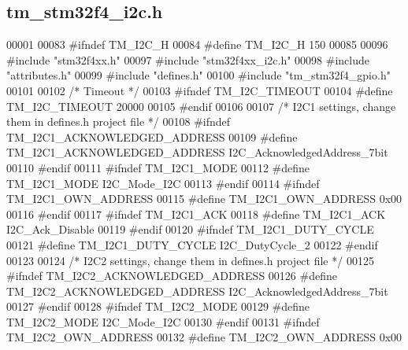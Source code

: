 \hypertarget{tm__stm32f4__i2c_8h_source}{}\subsection{tm\+\_\+stm32f4\+\_\+i2c.\+h}

\begin{DoxyCode}
00001 
00083 \textcolor{preprocessor}{#ifndef TM\_I2C\_H}
00084 \textcolor{preprocessor}{#define TM\_I2C\_H 150}
00085 
00096 \textcolor{preprocessor}{#include "stm32f4xx.h"}
00097 \textcolor{preprocessor}{#include "stm32f4xx\_i2c.h"}
00098 \textcolor{preprocessor}{#include "attributes.h"}
00099 \textcolor{preprocessor}{#include "defines.h"}
00100 \textcolor{preprocessor}{#include "tm\_stm32f4\_gpio.h"}
00101 
00102 \textcolor{comment}{/* Timeout */}
00103 \textcolor{preprocessor}{#ifndef TM\_I2C\_TIMEOUT}
00104 \textcolor{preprocessor}{#define TM\_I2C\_TIMEOUT                  20000}
00105 \textcolor{preprocessor}{#endif}
00106 
00107 \textcolor{comment}{/* I2C1 settings, change them in defines.h project file */}
00108 \textcolor{preprocessor}{#ifndef TM\_I2C1\_ACKNOWLEDGED\_ADDRESS}
00109 \textcolor{preprocessor}{#define TM\_I2C1\_ACKNOWLEDGED\_ADDRESS    I2C\_AcknowledgedAddress\_7bit}
00110 \textcolor{preprocessor}{#endif}
00111 \textcolor{preprocessor}{#ifndef TM\_I2C1\_MODE}
00112 \textcolor{preprocessor}{#define TM\_I2C1\_MODE                    I2C\_Mode\_I2C}
00113 \textcolor{preprocessor}{#endif}
00114 \textcolor{preprocessor}{#ifndef TM\_I2C1\_OWN\_ADDRESS}
00115 \textcolor{preprocessor}{#define TM\_I2C1\_OWN\_ADDRESS             0x00}
00116 \textcolor{preprocessor}{#endif}
00117 \textcolor{preprocessor}{#ifndef TM\_I2C1\_ACK}
00118 \textcolor{preprocessor}{#define TM\_I2C1\_ACK                     I2C\_Ack\_Disable}
00119 \textcolor{preprocessor}{#endif}
00120 \textcolor{preprocessor}{#ifndef TM\_I2C1\_DUTY\_CYCLE}
00121 \textcolor{preprocessor}{#define TM\_I2C1\_DUTY\_CYCLE              I2C\_DutyCycle\_2}
00122 \textcolor{preprocessor}{#endif}
00123 
00124 \textcolor{comment}{/* I2C2 settings, change them in defines.h project file */}
00125 \textcolor{preprocessor}{#ifndef TM\_I2C2\_ACKNOWLEDGED\_ADDRESS}
00126 \textcolor{preprocessor}{#define TM\_I2C2\_ACKNOWLEDGED\_ADDRESS    I2C\_AcknowledgedAddress\_7bit}
00127 \textcolor{preprocessor}{#endif}
00128 \textcolor{preprocessor}{#ifndef TM\_I2C2\_MODE}
00129 \textcolor{preprocessor}{#define TM\_I2C2\_MODE                    I2C\_Mode\_I2C}
00130 \textcolor{preprocessor}{#endif}
00131 \textcolor{preprocessor}{#ifndef TM\_I2C2\_OWN\_ADDRESS}
00132 \textcolor{preprocessor}{#define TM\_I2C2\_OWN\_ADDRESS             0x00}

\end{DoxyCode}
